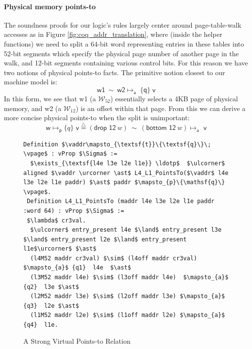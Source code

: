 \paragraph{Physical memory  points-to} The soundness proofs for our logic's rules largely center around page-table-walk accesses as in Figure \ref{fig:coq_addr_translation},
 where (inside the helper functions) we need to split a 64-bit word representing entries in these tables into 52-bit segments
which specify the physical page number of another page in the walk, and 12-bit segments containing various control bits.
For this reason we have two notions of physical points-to facts. The primitive notion closest to our machine model is:
\[ \textsf{w1} \ \sim \ \textsf{w2} \mapsto_{\textsf{a}} \; \{\textsf{q}\} \; \textsf{v} \]
In this form, we see that \textsf{w1} (a $\mathcal{W}_{52}$) essentially selects a 4KB page of physical memory,
and \textsf{w2} (a $\mathcal{W}_{12}$) is an offset within that page.
From this we can derive a more concise physical points-to when the split is unimportant:
\[\textsf{w} \mapsto_{\textsf{p}} \{q\} \textsf{ v} \stackrel{\triangle}{=} (\textsf{drop 12}~w) \ \sim \ (\textsf{bottom 12}~w)\mapsto_{\textsf{a}} \textsf{ v} \]

\begin{figure}
  \begin{lstlisting}[language=Coq]
 Definition $\vaddr\mapsto_{\textsf{t}}\{\textsf{q}\}\; \vpage$ : vProp $\Sigma$ := 
  $\exists_{\textsf{l4e l3e l2e l1e}} \ldotp$  $\ulcorner$ aligned $\vaddr \urcorner \ast$ L4_L1_PointsTo($\vaddr$ l4e l3e l2e l1e paddr) $\ast$ paddr $\mapsto_{p}\{\mathsf{q}\} \vpage$.
 Definition L4_L1_PointsTo (maddr l4e l3e l2e l1e paddr :word 64) : vProp $\Sigma$ :=
 $\lambda$ cr3val.
  $\ulcorner$ entry_present l4e $\land$ entry_present l3e $\land$ entry_present l2e $\land$ entry_present l1e$\urcorner$ $\ast$
  (l4M52 maddr cr3val) $\sim$ (l4off maddr cr3val) $\mapsto_{a}$ {q1}  l4e  $\ast$
  (l3M52 maddr l4e) $\sim$ (l3off maddr l4e)  $\mapsto_{a}$ {q2}  l3e $\ast$ 
  (l2M52 maddr l3e) $\sim$ (l2off maddr l3e) $\mapsto_{a}$ {q3}  l2e $\ast$
  (l1M52 maddr l2e) $\sim$ (l1off maddr l2e) $\mapsto_{a}$ {q4}  l1e.
\end{lstlisting}
\vspace{-1em}
\caption{A Strong Virtual Points-to Relation}
  \label{fig:strongvirtualpointsto}
\end{figure}



